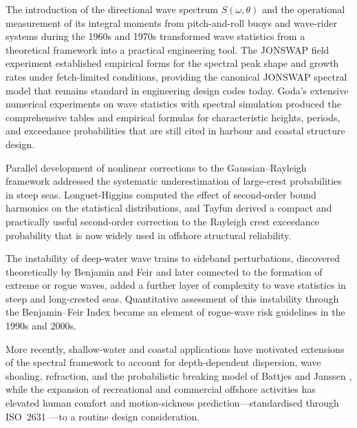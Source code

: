 \documentclass[journal]{IEEEtran}
\begin{document}
    The introduction of the directional wave spectrum $S(\omega,\theta)$ and
    the operational measurement of its integral moments from pitch-and-roll
    buoys and wave-rider systems during the 1960s and 1970s transformed wave
    statistics from a theoretical framework into a practical engineering tool.
    The JONSWAP field experiment \cite{Hasselmann1973} established empirical
    forms for the spectral peak shape and growth rates under fetch-limited
    conditions, providing the canonical JONSWAP spectral model that remains
    standard in engineering design codes today.
    Goda's extensive numerical experiments on wave statistics with spectral
    simulation \cite{Goda1970, Goda1985} produced the comprehensive tables
    and empirical formulas for characteristic heights, periods, and
    exceedance probabilities that are still cited in harbour and coastal
    structure design.

    Parallel development of nonlinear corrections to the Gaussian--Rayleigh
    framework addressed the systematic underestimation of large-crest
    probabilities in steep seas.
    Longuet-Higgins \cite{LonguetHiggins1963} computed the effect of
    second-order bound harmonics on the statistical distributions, and
    Tayfun \cite{Tayfun1980} derived a compact and practically useful
    second-order correction to the Rayleigh crest exceedance probability
    that is now widely used in offshore structural reliability.

    The instability of deep-water wave trains to sideband perturbations,
    discovered theoretically by Benjamin and Feir \cite{BenjaminFeir1967}
    and later connected to the formation of extreme or rogue waves, added a
    further layer of complexity to wave statistics in steep and
    long-crested seas.
    Quantitative assessment of this instability through the Benjamin--Feir
    Index became an element of rogue-wave risk guidelines in the 1990s and
    2000s.

    More recently, shallow-water and coastal applications have motivated
    extensions of the spectral framework to account for depth-dependent
    dispersion, wave shoaling, refraction, and the probabilistic breaking
    model of Battjes and Janssen \cite{Battjes1978}, while the expansion of
    recreational and commercial offshore activities has elevated human
    comfort and motion-sickness prediction---standardised through
    ISO~2631 \cite{ISO2631}---to a routine design consideration.
\end{document}
